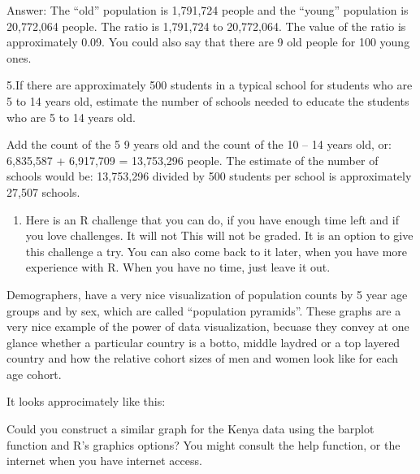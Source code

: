\documentclass[letterpaper,10pt,english]{jupyterBook}
\begin{document}
\sphinxAtStartPar
Answer: The “old” population is 1,791,724 people and the “young” population is 20,772,064
people. The ratio is 1,791,724 to 20,772,064. The value of the ratio is approximately
0.09. You could also say that there are 9 old people for 100 young ones.

\sphinxAtStartPar
5.If there are approximately 500 students in a typical school for students who are 5 to
14 years old, estimate the number of schools needed to educate the students who
are 5 to 14 years old.

\sphinxAtStartPar
Add the count of the 5\sphinxhyphen{} 9 years old and the count of the 10 – 14 years old, or:
6,835,587 + 6,917,709 = 13,753,296 people. The estimate of the number of schools
would be:
13,753,296 divided by 500 students per school is approximately 27,507 schools.
\begin{enumerate}
%
\setcounter{enumi}{5}
\item {} 
\sphinxAtStartPar
Here is an R challenge that you can do, if you have enough time left and if you love challenges. It will not This will not be graded. It is an option to give this challenge a try. You can also come back to it later, when you have more experience with R. When you have no time, just leave it out.

\end{enumerate}

\sphinxAtStartPar
Demographers, have a very nice visualization of population counts by 5 year age groups and by sex, which are called “population pyramids”. These graphs are a very nice example of the power of data visualization, becuase they convey at one glance whether a particular country is a botto, middle laydred or a top layered country and how the relative cohort sizes of men and women look like for each age cohort.

\sphinxAtStartPar
It looks approcimately like this:

\sphinxAtStartPar
{}

\sphinxAtStartPar
Could you construct a similar graph for the Kenya data using the barplot function and R’s graphics options? You might consult the help function, or the internet when you have internet access.
\end{document}
